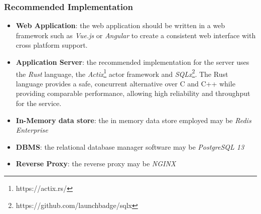 \subsubsection*{Recommended Implementation}
\begin{itemize}
    \item \textbf{Web Application}: the web application should be written in a web framework such as \emph{Vue.js} or \emph{Angular} to create a consistent web interface with cross platform support.
    \item \textbf{Application Server}: the recommended implementation for the server uses the \emph{Rust} language, the \emph{Actix}\footnote{https://actix.rs/} actor framework and \emph{SQLx}\footnote{https://github.com/launchbadge/sqlx}. The Rust language provides a safe, concurrent alternative over C and C++ while providing comparable performance, allowing high reliability and throughput for the service.
    \item \textbf{In-Memory data store}: the in memory data store employed may be \emph{Redis Enterprise}
    \item \textbf{DBMS}: the relational database manager software may be \emph{PostgreSQL 13}
    \item \textbf{Reverse Proxy}: the reverse proxy may be \emph{NGINX}
\end{itemize}


